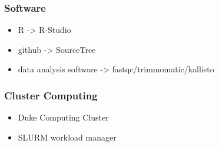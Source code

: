\documentclass[14pt]{beamer}
\begin{document}
\begin{frame}
\frametitle{Software}
\begin{itemize}
	\item<1-> R -> R-Studio
	\item<2-> github -> SourceTree
	\item<3-> data analysis software -> fastqc/trimmomatic/kallisto
\end{itemize}
\end{frame}
\begin{frame}
\frametitle{Cluster Computing}
\begin{itemize}
	\item Duke Computing Cluster
	\item SLURM workload manager
\end{itemize}
\end{frame}
\end{document}
